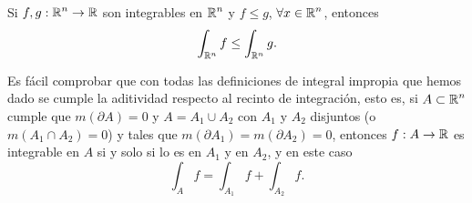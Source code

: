\begin{prop}[Monotonía]
	Si $\displaystyle f, g : \mathbb{R}^{n}\to \mathbb{R} $ son integrables en $\displaystyle \mathbb{R}^{n} $ y $\displaystyle f \leq g $, $\displaystyle \forall x \in \mathbb{R}^{n} $, entonces
	\[\int _{\mathbb{R}^{n}}f \leq \int _{\mathbb{R}^{n}}g .\]
\end{prop}
\begin{observation}
Es fácil comprobar que con todas las definiciones de integral impropia que hemos dado se cumple la aditividad respecto al recinto de integración, esto es, si $\displaystyle A \subset \mathbb{R}^{n} $ cumple que $\displaystyle m\left(\partial A\right)=0 $ y $\displaystyle A = A_{1}\cup A_{2} $ con $\displaystyle A_{1} $ y $\displaystyle A_{2} $ disjuntos (o $\displaystyle m\left(A_{1}\cap A_{2}\right)=0 $) y tales que $\displaystyle m\left(\partial A_{1}\right)=m\left(\partial A_{2}\right)=0 $, entonces $\displaystyle f : A \to \mathbb{R} $ es integrable en $\displaystyle A $ si y solo si lo es en $\displaystyle A_{1} $ y en $\displaystyle A_{2} $, y en este caso
\[\int _{A}f =\int _{A_{1}}f +\int _{A_{2}}f .\]
\end{observation}

